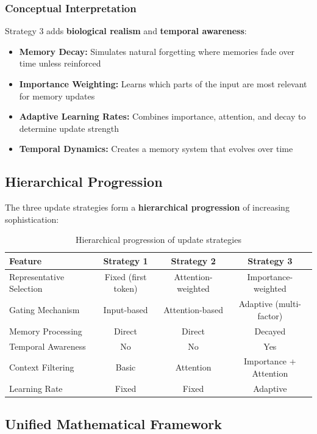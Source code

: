 \documentclass{article}
\begin{document}
\subsubsection{Conceptual Interpretation}

Strategy 3 adds \textbf{biological realism} and \textbf{temporal awareness}:

\begin{itemize}
\item \textbf{Memory Decay:} Simulates natural forgetting where memories fade over time unless reinforced
\item \textbf{Importance Weighting:} Learns which parts of the input are most relevant for memory updates
\item \textbf{Adaptive Learning Rates:} Combines importance, attention, and decay to determine update strength
\item \textbf{Temporal Dynamics:} Creates a memory system that evolves over time
\end{itemize}

\subsection{Hierarchical Progression}

The three update strategies form a \textbf{hierarchical progression} of increasing sophistication:

\begin{table}[h]
\centering
\begin{tabular}{|l|c|c|c|}
\hline
\textbf{Feature} & \textbf{Strategy 1} & \textbf{Strategy 2} & \textbf{Strategy 3} \\
\hline
Representative Selection & Fixed (first token) & Attention-weighted & Importance-weighted \\
Gating Mechanism & Input-based & Attention-based & Adaptive (multi-factor) \\
Memory Processing & Direct & Direct & Decayed \\
Temporal Awareness & No & No & Yes \\
Context Filtering & Basic & Attention & Importance + Attention \\
Learning Rate & Fixed & Fixed & Adaptive \\
\hline
\end{tabular}
\caption{Hierarchical progression of update strategies}
\end{table}

\subsection{Unified Mathematical Framework}
\end{document}
